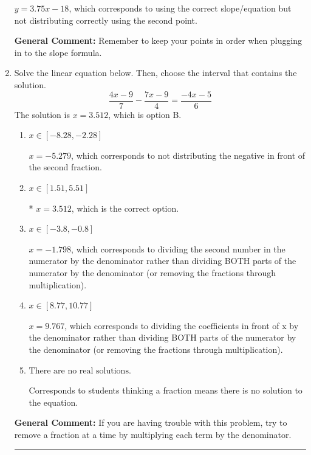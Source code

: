 \documentclass{extbook}[14pt]
\newcommand{\litem}[1]{\item #1

\rule{\textwidth}{0.4pt}}
\begin{document}
\begin{enumerate}
{\begin{enumerate}[label=\Alph*.]
 $y = 3.75x -18$, which corresponds to using the correct slope/equation but not distributing correctly using the second point.
\end{enumerate}

\textbf{General Comment:} Remember to keep your points in order when plugging in to the slope formula.
}
\litem{
Solve the linear equation below. Then, choose the interval that contains the solution.
\[ \frac{4x -9}{7} - \frac{7x -9}{4} = \frac{-4x -5}{6} \]The solution is \( x = 3.512 \), which is option B.\begin{enumerate}[label=\Alph*.]
\item \( x \in [-8.28, -2.28] \)

 $x = -5.279$, which corresponds to not distributing the negative in front of the second fraction.
\item \( x \in [1.51, 5.51] \)

* $x = 3.512$, which is the correct option.
\item \( x \in [-3.8, -0.8] \)

 $x = -1.798$, which corresponds to dividing the second number in the numerator by the denominator rather than dividing BOTH parts of the numerator by the denominator (or removing the fractions through multiplication).
\item \( x \in [8.77, 10.77] \)

 $x = 9.767$, which corresponds to dividing the coefficients in front of x by the denominator rather than dividing BOTH parts of the numerator by the denominator (or removing the fractions through multiplication).
\item \( \text{There are no real solutions.} \)

Corresponds to students thinking a fraction means there is no solution to the equation.
\end{enumerate}

\textbf{General Comment:} If you are having trouble with this problem, try to remove a fraction at a time by multiplying each term by the denominator.
}
\end{enumerate}
\end{document}
